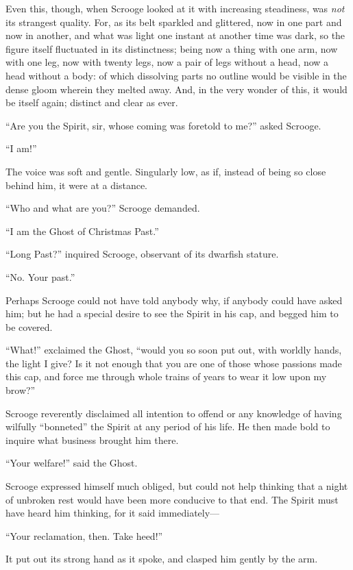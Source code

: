 \documentclass[paper=a5,BCOR=15mm,twoside,DIV=15,headinclude=off,12pt,chapterprefix=off,openany,headings=huge]{scrbook} %
\begin{document}
Even this, though, when Scrooge looked at it with increasing steadiness, was \textit{not} its strangest quality. For, as its belt sparkled and glittered, now in one part and now in another, and what was light one instant at another time was dark, so the figure itself fluctuated in its distinctness; being now a thing with one arm, now with one leg, now with twenty legs, now a pair of legs without a head, now a head without a body: of which dissolving parts no outline would be visible in the dense gloom wherein they melted away. And, in the very wonder of this, it would be itself again; distinct and clear as ever.

\enquote{Are you the Spirit, sir, whose coming was foretold to me?} asked Scrooge.

\enquote{I am!}

The voice was soft and gentle. Singularly low, as if, instead of being so close behind him, it were at a distance.

\enquote{Who and what are you?} Scrooge demanded.

\enquote{I am the Ghost of Christmas Past.}

\enquote{Long Past?} inquired Scrooge, observant of its dwarfish stature.

\enquote{No. Your past.}

Perhaps Scrooge could not have told anybody why, if anybody could have asked him; but he had a special desire to see the Spirit in his cap, and begged him to be covered.

\enquote{What!} exclaimed the Ghost, \enquote{would you so soon put out, with worldly hands, the light I give? Is it not enough that you are one of those whose passions made this cap, and force me through whole trains of years to wear it low upon my brow?}

Scrooge reverently disclaimed all intention to offend or any knowledge of having wilfully \enquote{bonneted} the Spirit at any period of his life. He then made bold to inquire what business brought him there.

\enquote{Your welfare!} said the Ghost.

Scrooge expressed himself much obliged, but could not help thinking that a night of unbroken rest would have been more conducive to that end. The Spirit must have heard him thinking, for it said immediately—

\enquote{Your reclamation, then. Take heed!}

It put out its strong hand as it spoke, and clasped him gently by the arm.
\end{document}
